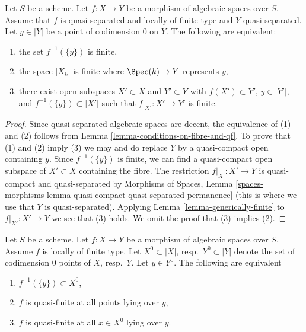 \begin{lemma}
\label{lemma-generically-finite-reprise}
Let $S$ be a scheme. Let $f : X \to Y$ be a morphism of algebraic spaces
over $S$. Assume that $f$ is quasi-separated and locally of finite type
and $Y$ quasi-separated. Let $y \in |Y|$ be a point of codimension $0$ on $Y$.
The following are equivalent:
\begin{enumerate}
\item the set $f^{-1}(\{y\})$ is finite,
\item the space $|X_k|$ is finite where $\Spec(k) \to Y$ represents $y$,
\item there exist open subspaces $X' \subset X$ and $Y' \subset Y$
with $f(X') \subset Y'$, $y \in |Y'|$, and $f^{-1}(\{y\}) \subset |X'|$
such that $f|_{X'} : X' \to Y'$ is finite.
\end{enumerate}
\end{lemma}

\begin{proof}
Since quasi-separated algebraic spaces are decent, the equivalence
of (1) and (2) follows from
Lemma \ref{lemma-conditions-on-fibre-and-qf}.
To prove that (1) and (2) imply (3)
we may and do replace $Y$ by a quasi-compact open containing $y$.
Since $f^{-1}(\{y\})$ is finite, we can find a quasi-compact
open subspace of $X' \subset X$ containing the fibre.
The restriction $f|_{X'} : X' \to Y$ is quasi-compact and quasi-separated
by Morphisms of Spaces, Lemma
\ref{spaces-morphisms-lemma-quasi-compact-quasi-separated-permanence}
(this is where we use that $Y$ is quasi-separated).
Applying Lemma \ref{lemma-generically-finite}
to $f|_{X'} : X' \to Y$ we see that (3) holds.
We omit the proof that (3) implies (2).
\end{proof}

\begin{lemma}
\label{lemma-quasi-finiteness-over-generic-point}
Let $S$ be a scheme. Let $f : X \to Y$ be a morphism of algebraic spaces
over $S$. Assume $f$ is locally of finite type.
Let $X^0 \subset |X|$, resp.\ $Y^0 \subset |Y|$ denote the set of
codimension $0$ points of $X$, resp.\ $Y$. Let $y \in Y^0$. The following are
equivalent
\begin{enumerate}
\item $f^{-1}(\{y\}) \subset X^0$,
\item $f$ is quasi-finite at all points lying over $y$,
\item $f$ is quasi-finite at all $x \in X^0$ lying over $y$.
\end{enumerate}
\end{lemma}

